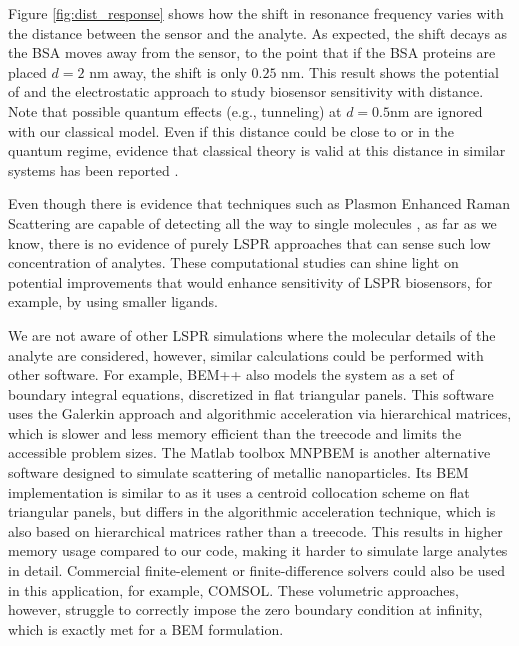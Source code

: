 Figure \ref{fig:dist_response} shows how the  shift in resonance frequency varies 
with the distance between the sensor and the analyte. As expected, the shift decays 
as the BSA moves away from the sensor, to the point that if the BSA proteins are placed
$d=2$ nm away, the shift is only $0.25$ nm. This result shows the potential of \pygbe 
and the electrostatic approach to study biosensor sensitivity with distance.
Note that possible quantum effects (e.g., tunneling) at $d=0.5$nm are ignored with our classical model.
Even if this distance could be close to or in the quantum regime, evidence that classical theory is valid at this distance in similar systems has been reported 
\cite{SavageETal2012, EstebanETal2012}.  

Even though there is evidence that techniques such as Plasmon Enhanced Raman Scattering are capable of detecting all the way to single molecules \cite{ZhangZhangETal2013}, 
as far as we know, there is no evidence of purely LSPR approaches that can sense such low concentration of analytes.
These computational studies can shine light on  potential improvements that would enhance sensitivity of LSPR biosensors, for example, by using smaller ligands. 

We are not aware of other LSPR simulations where the molecular details of the analyte are considered, however, similar calculations could be performed with other software. 
For example, BEM++ \cite{SmigajETal2015} also models the system as a set of boundary integral equations, discretized in flat triangular panels. 
This software uses the Galerkin approach and algorithmic acceleration via hierarchical matrices, which is slower and less memory efficient than the treecode and limits the accessible problem sizes.
The Matlab toolbox MNPBEM \cite{HohenesterTrugler2012} is another alternative software designed to simulate scattering of metallic nanoparticles.
Its BEM implementation is similar to \pygbe as it uses a centroid collocation scheme on flat triangular panels, but differs in the algorithmic acceleration technique, which is also based on hierarchical matrices rather than a treecode. 
This results in higher memory usage compared to our code, making it harder to simulate large analytes in detail.
Commercial finite-element or finite-difference solvers could also be used in this application, for example, COMSOL. 
These volumetric approaches, however, struggle to correctly impose the zero boundary condition at infinity, which is exactly met for a BEM formulation.
